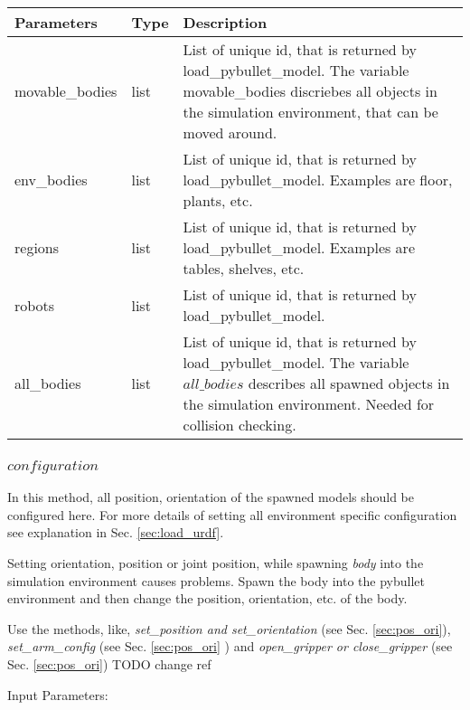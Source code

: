 \documentclass[
	ngerman,
	accentcolor=9c,%
	type=intern,
	marginpar=false
	]{tudapub}
\begin{document}
\begin{tabular}{|p{}| p{}| p{}|}
\hline
\textbf{Parameters} & \textbf{Type} & \textbf{Description} \\
\hline
movable\_bodies & list & List of unique id, that is returned by load\_pybullet\_model. The variable movable\_bodies discriebes all objects in the simulation environment, that can be moved around. \\
\hline
env\_bodies & list & List of unique id, that is returned by load\_pybullet\_model. Examples are floor, plants, etc.\\
\hline
regions & list &List of unique id, that is returned by load\_pybullet\_model. Examples are tables, shelves, etc. \\
\hline
robots & list &List of unique id, that is returned by load\_pybullet\_model.  \\
\hline
all\_bodies & list &List of unique id, that is returned by load\_pybullet\_model. The variable $all\_bodies$ describes all spawned objects in the simulation environment. Needed for collision checking.\\
\hline
\end{tabular}


\vspace{0.5cm}


\subsubsection{$configuration$}
\noindent In this method, all position, orientation of the spawned models should be configured here. For more details of setting all environment specific configuration see explanation in Sec. \ref{sec:load_urdf}.

\vspace{0.2cm}
\noindent Setting orientation, position or joint position, while spawning \textit{body} into the simulation environment causes problems. Spawn the body into the pybullet environment and then change the position, orientation, etc. of the body. 

\vspace{0.2cm}
\noindent Use the methods, like,  \textit{set\_position and set\_orientation} (see Sec. \ref{sec:pos_ori}), \textit{set\_arm\_config} (see Sec. \ref{sec:pos_ori} ) and \textit{open\_gripper or close\_gripper}  (see Sec. \ref{sec:pos_ori}) TODO change ref

\vspace{0.5cm}
\noindent Input Parameters:
\vspace{0.5cm}
\end{document}

